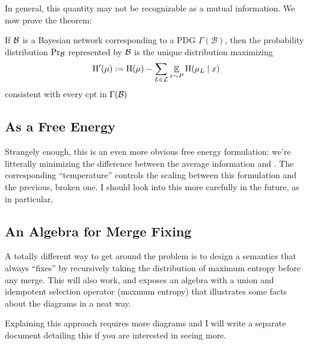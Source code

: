 \documentclass{article}
\begin{document}
	In general, this quantity may not be recognizable as a mutual information. We now prove the theorem:
	
	\begin{theorem}
		If $\cal B$ is a Bayesian network corresponding to a PDG $\Gamma(\mathcal B)$, then the probability distribution $\Pr_{\cal B}$ represented by $\cal B$ is the unique distribution maximizing
		\[ \mathrm{H}'(\mu) := \mathrm{H}(\mu) - \sum_{L \in \cal L} \mathop{\mathbb E}_{x \sim P}  \mathrm{H} (\mu_L \mid x)\] 
		consistent with every cpt in $\Gamma(\cal B)$
	\end{theorem}
	
	\subsection{As a Free Energy}
	Strangely enough, this is an even more obvious free energy formulation: we're litterally minimizing the difference between the average information and . The corresponding ``temperature'' controls the scaling between this formulation and the previous, broken one. I should look into this more carefully in the future, as in particular, 
	
	\subsection{An Algebra for Merge Fixing}
	A totally different way to get around the problem is to design a semantics that always ``fixes'' by recursively taking the distribution of maximum entropy before any merge. This will also work, and exposes an algebra with a union and idempotent selection operator (maxmum entropy) that illustrates some facts about the diagrams in a neat way. 
	
	Explaining this approach requires more diagrams and I will write a separate document detailing this if you are interested in seeing more.
	
\end{document}
